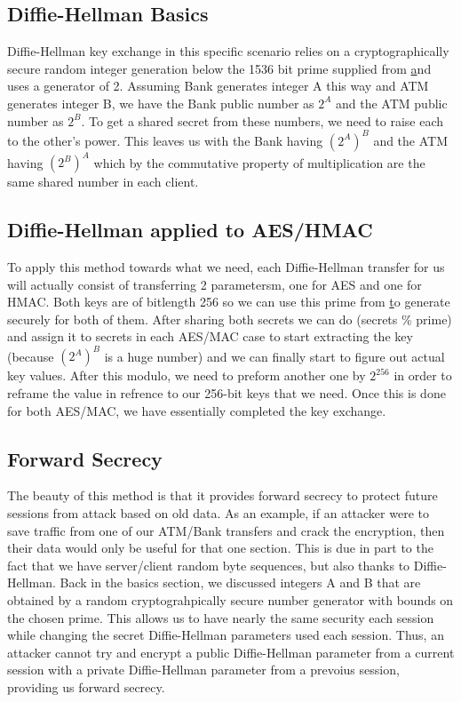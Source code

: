 \documentclass{article}
\begin{document}
			\subsection{Diffie-Hellman Basics}\label{sec:dhexbasic}
				Diffie-Hellman key exchange in this specific scenario relies on a cryptographically secure random integer generation below the 1536 bit prime supplied from \href{https://www.ietf.org/rfc/rfc3526.txt} and uses a generator of 2. Assuming Bank generates integer A this way and ATM generates integer B, we have the Bank public number as $2^A$ and the ATM public number as $2^B$. To get a shared secret from these numbers, we need to raise each to the other's power. This leaves us with the Bank having $(2^A)^B$ and the ATM having $(2^B)^A$ which by the commutative property of multiplication are the same shared number in each client.
			
			\subsection{Diffie-Hellman applied to AES/HMAC}\label{sec:dhexahm}
				To apply this method towards what we need, each Diffie-Hellman transfer for us will actually consist of transferring 2 parametersm, one for AES and one for HMAC. Both keys are of bitlength 256 so we can use this prime from \href{https://www.ietf.org/rfc/rfc3526.txt} to generate securely for both of them. After sharing both secrets we can do (secrets \% prime) and assign it to secrets in each AES/MAC case to start extracting the key (because $(2^A)^B$ is a huge number) and we can finally start to figure out actual key values. After this modulo, we need to preform another one by $2^256$ in order to reframe the value in refrence to our 256-bit keys that we need. Once this is done for both AES/MAC, we have essentially completed the key exchange.
				
			\subsection{Forward Secrecy}\label{sec:dhexfwd}
				The beauty of this method is that it provides forward secrecy to protect future sessions from attack based on old data. As an example, if an attacker were to save traffic from one of our ATM/Bank transfers and crack the encryption, then their data would only be useful for that one section. This is due in part to the fact that we have server/client random byte sequences, but also thanks to Diffie-Hellman. Back in the basics section, we discussed integers A and B that are obtained by a random cryptograhpically secure number generator with bounds on the chosen prime. This allows us to have nearly the same security each session while changing the secret Diffie-Hellman parameters used each session. Thus, an attacker cannot try and encrypt a public Diffie-Hellman parameter from a current session with a private Diffie-Hellman parameter from a prevoius session, providing us forward secrecy.
		
\end{document}
